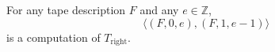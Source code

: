 For any tape description $F$ and any $e \in \mathbb{Z}$,
\[
\langle (F, 0, e), (F, 1, e - 1) \rangle
\]
is a computation of $T_{\text{right}}$.
